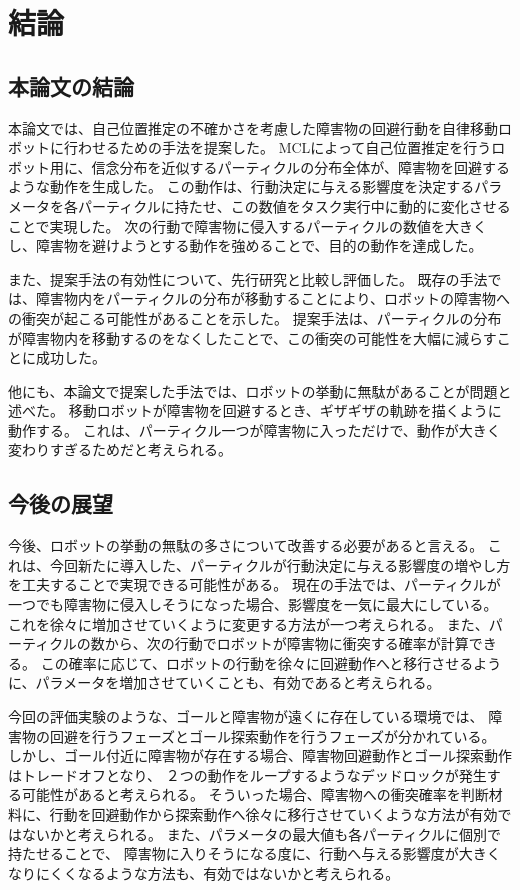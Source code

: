 \chapter{結論} \label{chapter:conclusion}

\section{本論文の結論}
本論文では、自己位置推定の不確かさを考慮した障害物の回避行動を自律移動ロボットに行わせるための手法を提案した。
MCLによって自己位置推定を行うロボット用に、信念分布を近似するパーティクルの分布全体が、障害物を回避するような動作を生成した。
この動作は、行動決定に与える影響度を決定するパラメータを各パーティクルに持たせ、この数値をタスク実行中に動的に変化させることで実現した。
次の行動で障害物に侵入するパーティクルの数値を大きくし、障害物を避けようとする動作を強めることで、目的の動作を達成した。

また、提案手法の有効性について、先行研究と比較し評価した。
既存の手法では、障害物内をパーティクルの分布が移動することにより、ロボットの障害物への衝突が起こる可能性があることを示した。
提案手法は、パーティクルの分布が障害物内を移動するのをなくしたことで、この衝突の可能性を大幅に減らすことに成功した。

他にも、本論文で提案した手法では、ロボットの挙動に無駄があることが問題と述べた。
移動ロボットが障害物を回避するとき、ギザギザの軌跡を描くように動作する。
これは、パーティクル一つが障害物に入っただけで、動作が大きく変わりすぎるためだと考えられる。

\newpage

\section{今後の展望}
今後、ロボットの挙動の無駄の多さについて改善する必要があると言える。
これは、今回新たに導入した、パーティクルが行動決定に与える影響度の増やし方を工夫することで実現できる可能性がある。
現在の手法では、パーティクルが一つでも障害物に侵入しそうになった場合、影響度を一気に最大にしている。
これを徐々に増加させていくように変更する方法が一つ考えられる。
また、パーティクルの数から、次の行動でロボットが障害物に衝突する確率が計算できる。
この確率に応じて、ロボットの行動を徐々に回避動作へと移行させるように、パラメータを増加させていくことも、有効であると考えられる。

今回の評価実験のような、ゴールと障害物が遠くに存在している環境では、
障害物の回避を行うフェーズとゴール探索動作を行うフェーズが分かれている。
しかし、ゴール付近に障害物が存在する場合、障害物回避動作とゴール探索動作はトレードオフとなり、
２つの動作をループするようなデッドロックが発生する可能性があると考えられる。
そういった場合、障害物への衝突確率を判断材料に、行動を回避動作から探索動作へ徐々に移行させていくような方法が有効ではないかと考えられる。
また、パラメータの最大値も各パーティクルに個別で持たせることで、
障害物に入りそうになる度に、行動へ与える影響度が大きくなりにくくなるような方法も、有効ではないかと考えられる。
